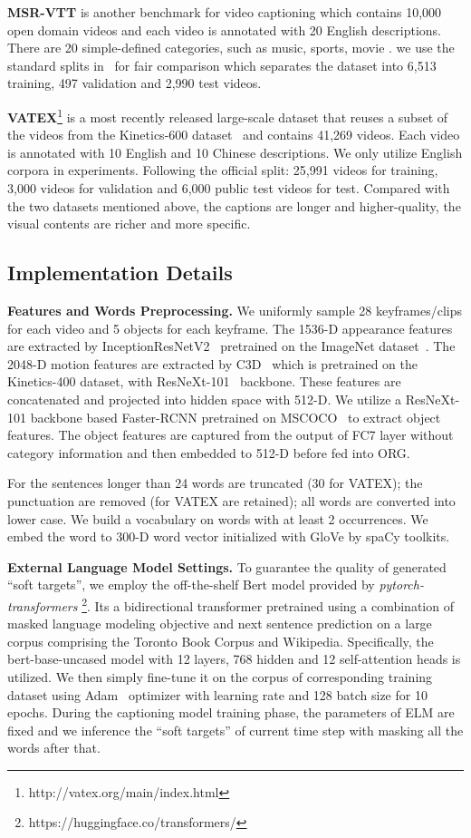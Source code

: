\documentclass[10pt,twocolumn,letterpaper]{article}
\begin{document}
\textbf{MSR-VTT} is another benchmark for video captioning which contains 10,000 open domain videos and each video is annotated with 20 English descriptions. There are 20 simple-defined categories, such as music, sports, movie \etc. we use the standard splits in~\cite{Xu2016} for fair comparison which separates the dataset into 6,513 training, 497 validation and 2,990 test videos.

\textbf{VATEX}\footnote{http://vatex.org/main/index.html} is a most recently released large-scale dataset that reuses a subset of the videos from the Kinetics-600 dataset~\cite{Kay2017} and contains 41,269 videos. Each video is annotated with 10 English and 10 Chinese descriptions. We only utilize English corpora in experiments. Following the official split: 25,991 videos for training, 3,000 videos for validation and 6,000 public test videos for test. Compared with the two datasets mentioned above, the captions are longer and higher-quality, the visual contents are richer and more specific.

\subsection{Implementation Details}


\textbf{Features and Words Preprocessing.} We uniformly sample 28 keyframes/clips for each video and 5 objects for each keyframe. The 1536-D appearance features are extracted by InceptionResNetV2~\cite{Szegedy2017} pretrained on the ImageNet dataset~\cite{Russakovsky2015}. The 2048-D motion features are extracted by C3D~\cite{Hara2018} which is pretrained on the Kinetics-400 dataset, with ResNeXt-101~\cite{Xie2017} backbone. These features are concatenated and projected into hidden space with 512-D. We utilize a ResNeXt-101 backbone based Faster-RCNN pretrained on MSCOCO~\cite{Chen2019a} to extract object features. The object features are captured from the output of FC7 layer without category information and then embedded to 512-D before fed into ORG.

For the sentences longer than 24 words are truncated (30 for VATEX); the punctuation are removed (for VATEX are retained); all words are converted into lower case. We build a vocabulary on words with at least 2 occurrences. We embed the word to 300-D word vector initialized with GloVe by spaCy toolkits.

\textbf{External Language Model Settings.} To guarantee the quality of generated ``soft targets'', we employ the off-the-shelf Bert model provided by \textit{pytorch-transformers} \footnote{https://huggingface.co/transformers/}. Its a bidirectional transformer pretrained using a combination of masked language modeling objective and next sentence prediction on a large corpus comprising the Toronto Book Corpus and Wikipedia. Specifically, the bert-base-uncased model with 12 layers, 768 hidden and 12 self-attention heads is utilized. We then simply fine-tune it on the corpus of corresponding training dataset using Adam~\cite{Kingma2015} optimizer with  learning rate and 128 batch size for 10 epochs. During the captioning model training phase, the parameters of ELM are fixed and we inference the ``soft targets'' of current time step with masking all the words after that.
\end{document}
